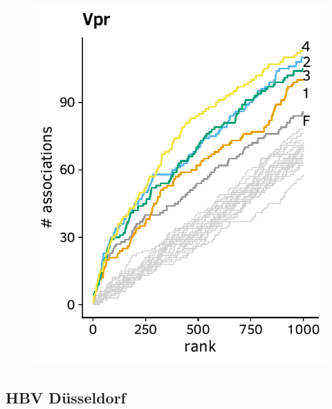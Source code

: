 \documentclass[a4paper,11pt]{article}
\begin{document}
\begin{figure}[H]
\begin{minipage}{.49\textwidth}
      \includegraphics[width=\linewidth]{plots/comparison_plots/hiv_brumme/vpr_new_map.pdf}
    \end{minipage}
\end{figure}

\FloatBarrier
\subsection*{HBV Düsseldorf}
\end{document}

